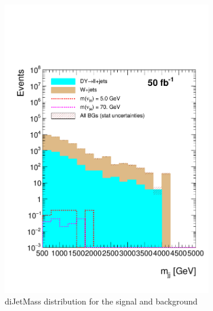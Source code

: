 \begin{figure}[h]
\begin{subfigure}{.5\textwidth}
  \includegraphics[width=1.1\linewidth]{./Capitulos/Analysis/AfterVBFCUTS/mjj_MET_20}
  \caption{diJetMass distribution for the signal and background}
  \label{diJetMass_VBF}
\end{subfigure}
\begin{subfigure}{.5\textwidth}
  \centering

\end{subfigure}
\end{figure}
